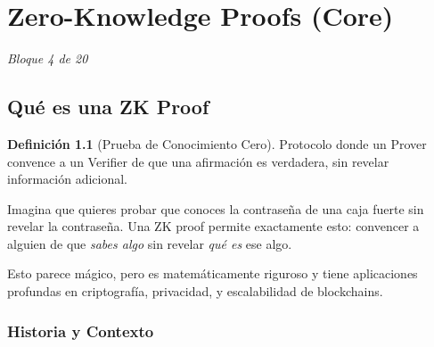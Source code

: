 \documentclass[11pt,a4paper,twoside,openright]{book}
\theoremstyle{definition}
\newtheorem{definition}{Definición}[chapter]
\theoremstyle{plain}
\theoremstyle{remark}
\begin{document}
\chapter{Zero-Knowledge Proofs (Core)}
\label{ch:bloque4}

\begin{center}
\textit{Bloque 4 de 20}
\end{center}

\section{Qué es una ZK Proof}

\begin{definition}[Prueba de Conocimiento Cero]
Protocolo donde un Prover convence a un Verifier de que una afirmación es verdadera, sin revelar información adicional.
\end{definition}

\begin{intuicion}
Imagina que quieres probar que conoces la contraseña de una caja fuerte sin revelar la contraseña. Una ZK proof permite exactamente esto: convencer a alguien de que \textit{sabes algo} sin revelar \textit{qué es} ese algo.

Esto parece mágico, pero es matemáticamente riguroso y tiene aplicaciones profundas en criptografía, privacidad, y escalabilidad de blockchains.
\end{intuicion}

\subsection{Historia y Contexto}
\end{document}
